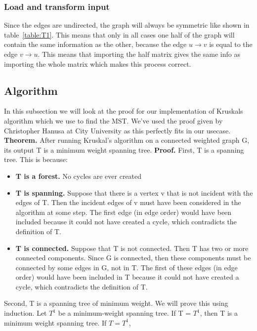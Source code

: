 \documentclass{article}
\begin{document}
\subsubsection{Load and transform input}
Since the edges are undirected, the graph will always be symmetric like shown in table~\ref{table:T1}. This means that only in all cases one half of the graph will contain the same information as the other, because the edge $u \to v$ is equal to the edge $v \to u$. This means that importing the half matrix gives the same info as importing the whole matrix which makes this process correct.

\subsection{Algorithm}
In this subsection we will look at the proof for our implementation of Kruskals algorithm which we use to find the MST. We've used the proof given by Christopher Hanusa at City University as this perfectly fits in our usecase.
\newline
\newline
\textbf{Theorem.} After running Kruskal’s algorithm on a connected weighted graph G, its output T is a
minimum weight spanning tree.
\newline
\newline
\textbf{Proof.} First, T is a spanning tree. This is because:
\begin{itemize}
  \item \textbf{T is a forest.} No cycles are ever created
  \item \textbf{T is spanning.} Suppose that there is a vertex v that is not incident with the edges of T.
Then the incident edges of v must have been considered in the algorithm at some step. The
first edge (in edge order) would have been included because it could not have created a cycle,
which contradicts the definition of T.
  \item \textbf{T is connected.} Suppose that T is not connected. Then T has two or more connected
components. Since G is connected, then these components must be connected by some edges
in G, not in T. The first of these edges (in edge order) would have been included in T because
it could not have created a cycle, which contradicts the definition of T.
\end{itemize}
Second, T is a spanning tree of minimum weight. We will prove this using induction. Let $T^1$ be a
minimum-weight spanning tree. If T = $T^1$, then T is a minimum weight spanning tree. If $T = T^1$,
\end{document}
